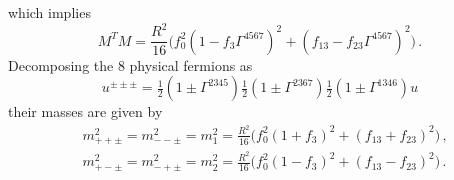 \documentclass[a4paper,11pt]{article}
\begin{document}
which implies
\begin{equation}
M^TM=\frac{R^2}{16}\big(f_0^2(1-f_3\Gamma^{4567})^2+(f_{13}-f_{23}\Gamma^{4567})^2\big)\,.
\end{equation}
Decomposing the 8 physical fermions as
\begin{equation}
u^{\pm\pm\pm}=\tfrac12(1\pm\Gamma^{2345})\tfrac12(1\pm\Gamma^{2367})\tfrac12(1\pm\Gamma^{1346})u
\end{equation}
their masses are given by
\begin{align}
&m_{++\pm}^2=m_{--\pm}^2=m_1^2=\frac{R^2}{16}\big(f_0^2(1+f_3)^2+(f_{13}+f_{23})^2\big)\,,\nonumber\\
&m_{+-\pm}^2=m_{-+\pm}^2=m_2^2=\frac{R^2}{16}\big(f_0^2(1-f_3)^2+(f_{13}-f_{23})^2\big)\,.
\label{eq:masses}
\end{align}
\end{document}
